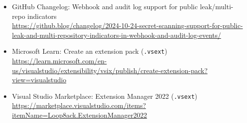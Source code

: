 \documentclass[11pt]{article}
\newcommand{\code}[1]{\texttt{#1}}
\begin{document}
\begin{itemize}
  \item GitHub Changelog: Webhook and audit log support for public leak/multi-repo indicators\\
    \href{https://github.blog/changelog/2024-10-24-secret-scanning-support-for-public-leak-and-multi-repository-indicators-in-webhook-and-audit-log-events/}{https://github.blog/changelog/2024-10-24-secret-scanning-support-for-public-leak-and-multi-repository-indicators-in-webhook-and-audit-log-events/}
  \item Microsoft Learn: Create an extension pack (\code{.vsext})\\
    \href{https://learn.microsoft.com/en-us/visualstudio/extensibility/vsix/publish/create-extension-pack?view=visualstudio}{https://learn.microsoft.com/en-us/visualstudio/extensibility/vsix/publish/create-extension-pack?view=visualstudio}
  \item Visual Studio Marketplace: Extension Manager 2022 (\code{.vsext})\\
    \href{https://marketplace.visualstudio.com/items?itemName=Loop8ack.ExtensionManager2022}{https://marketplace.visualstudio.com/items?itemName=Loop8ack.ExtensionManager2022}
\end{itemize}
\end{document}

